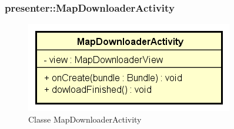 \documentclass[../DefinizioneDiProdotto.tex]{subfiles}
\begin{document}
\subsubsection{presenter::MapDownloaderActivity}

    \begin{figure}[H]
        \centering
        \includegraphics{img/MapDownloaderActivity.png}
        \caption{Classe MapDownloaderActivity}\label{fig:presenter::MapDownloaderActivity} 
    \end{figure}
\end{document}
